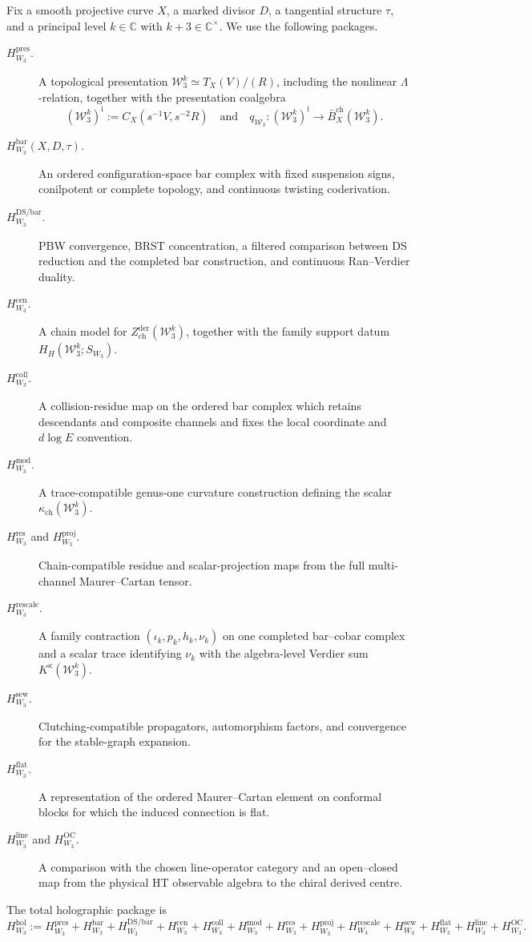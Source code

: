 Fix a smooth projective curve \(X\), a marked divisor \(D\), a
tangential structure \(\tau\), and a principal level
\(k\in\mathbb C\) with \(k+3\in\mathbb C^\times\).  We use the
following packages.
\begin{description}
\item[\(H_{W_3}^{\mathrm{pres}}\).]
A topological presentation
\(\mathcal W_3^k\simeq T_X(V)/(R)\), including the nonlinear
\(\Lambda\)-relation, together with the presentation coalgebra
\[
(\mathcal W_3^k)^{\mathrm i}:=C_X(s^{-1}V,s^{-2}R)
\quad\text{and}\quad
q_{\mathcal W_3}\colon
(\mathcal W_3^k)^{\mathrm i}\longrightarrow
\bar B_X^{\mathrm{ch}}(\mathcal W_3^k).
\]
\item[\(H_{W_3}^{\mathrm{bar}}(X,D,\tau)\).]
An ordered configuration-space bar complex with fixed suspension
signs, conilpotent or complete topology, and continuous twisting
coderivation.
\item[\(H_{W_3}^{\mathrm{DS/bar}}\).]
PBW convergence, BRST concentration, a filtered comparison between
DS reduction and the completed bar construction, and continuous
Ran--Verdier duality.
\item[\(H_{W_3}^{\mathrm{cen}}\).]
A chain model for
\(Z_{\mathrm{ch}}^{\mathrm{der}}(\mathcal W_3^k)\), together with the
family support datum
\(H_H(\mathcal W_3^k;S_{W_3})\).
\item[\(H_{W_3}^{\mathrm{coll}}\).]
A collision-residue map on the ordered bar complex which retains
descendants and composite channels and fixes the local coordinate
and \(d\log E\) convention.
\item[\(H_{W_3}^{\mathrm{mod}}\).]
A trace-compatible genus-one curvature construction defining the
scalar \(\kappa_{\mathrm{ch}}(\mathcal W_3^k)\).
\item[\(H_{W_3}^{\mathrm{res}}\) and
\(H_{W_3}^{\mathrm{proj}}\).]
Chain-compatible residue and scalar-projection maps from the full
multi-channel Maurer--Cartan tensor.
\item[\(H_{W_3}^{\mathrm{rescale}}\).]
A family contraction \((\iota_k,p_k,h_k,\nu_k)\) on one completed
bar--cobar complex and a scalar trace identifying \(\nu_k\) with the
algebra-level Verdier sum \(K^\kappa(\mathcal W_3^k)\).
\item[\(H_{W_3}^{\mathrm{sew}}\).]
Clutching-compatible propagators, automorphism factors, and
convergence for the stable-graph expansion.
\item[\(H_{W_3}^{\mathrm{flat}}\).]
A representation of the ordered Maurer--Cartan element on conformal
blocks for which the induced connection is flat.
\item[\(H_{W_3}^{\mathrm{line}}\) and
\(H_{W_3}^{\mathrm{OC}}\).]
A comparison with the chosen line-operator category and an
open--closed map from the physical HT observable algebra to the
chiral derived centre.
\end{description}
The total holographic package is
\[
H_{W_3}^{\mathrm{hol}}
:=
H_{W_3}^{\mathrm{pres}}+
H_{W_3}^{\mathrm{bar}}+
H_{W_3}^{\mathrm{DS/bar}}+
H_{W_3}^{\mathrm{cen}}+
H_{W_3}^{\mathrm{coll}}+
H_{W_3}^{\mathrm{mod}}+
H_{W_3}^{\mathrm{res}}+
H_{W_3}^{\mathrm{proj}}+
H_{W_3}^{\mathrm{rescale}}+
H_{W_3}^{\mathrm{sew}}+
H_{W_3}^{\mathrm{flat}}+
H_{W_3}^{\mathrm{line}}+
H_{W_3}^{\mathrm{OC}}.
\]

